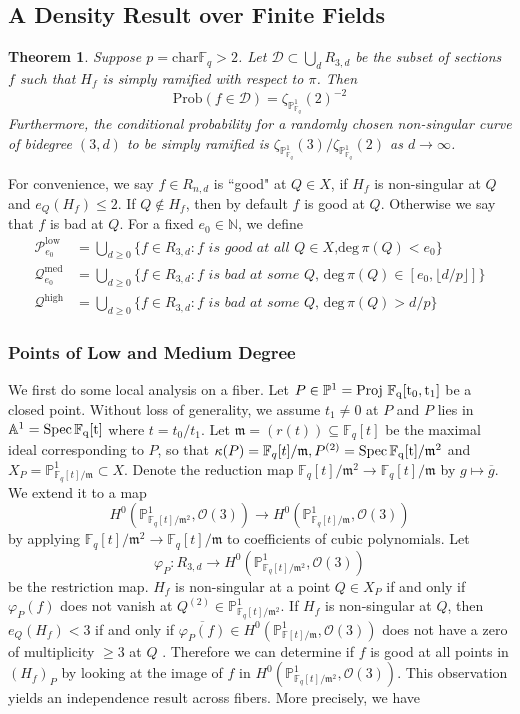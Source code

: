\documentclass[12pt]{article}
\theoremstyle{plain}
\newtheorem{theorem}[equation]{Theorem}
\theoremstyle{definition}
\newcommand{\fm}{\mathfrak{m}}
\newcommand{\IA}{\mathbb{A}}
\newcommand{\IN}{\mathbb{N}}
\newcommand{\IF}{\mathbb{F}}
\newcommand{\IP}{\mathbb{P}}
\newcommand{\sD}{\mathcal{D}}
\newcommand{\sO}{\mathcal{O}}
\newcommand{\sP}{\mathcal{P}}
\newcommand{\sQ}{\mathcal{Q}}
\renewcommand{\deg}{\mathrm{deg}\,}
\newcommand{\Spec}{\rm Spec\,}
\newcommand{\Proj}{\rm Proj\,}
\newcommand\union{\bigcup}
\newcommand\wb{\overline}
\newcommand{\<}{\langle}
\renewcommand{\>}{\rangle}
\newcommand{\Prob}{\mathrm{Prob}}
\begin{document}
\subsection{A Density Result over Finite Fields}
\begin{theorem}
\label{main}
Suppose $p = \mathrm{char } \IF_q > 2$. Let $\sD \subset \union_d R_{3,d}$ be the subset of sections $f$ such that $H_f$ is simply ramified with respect to $\pi$. Then
$$ \Prob(f \in \sD) = \zeta_{\IP^1_{\IF_q}}(2)^{-2} $$ Furthermore, the conditional probability for a randomly chosen non-singular curve of bidegree $(3, d)$ to be simply ramified is $\zeta_{\IP^1_{\IF_q}}(3)/\zeta_{\IP^1_{\IF_q}}(2)$ as $d \to \infty$. 
\end{theorem}
For convenience, we say $f \in R_{n, d}$ is ``good" at $Q \in X$, if $H_f$ is non-singular at $Q$ and $e_Q(H_f) \le 2$. If $Q \not\in H_f$, then by default $f$ is good at $Q$. Otherwise we say that $f$ is bad at $Q$. For a fixed $e_0 \in \IN$, we define 
\begin{align*}
\sP_{e_0}^{\mathrm{low}} &= \union_{d \ge 0} \{ f \in R_{3, d} : f \textit{ is good at all $Q \in X$,}\deg \pi(Q) < e_0\}\\
\sQ_{e_0}^{\mathrm{med}} &= \union_{d \ge 0} \{f \in R_{3, d} : f \textit{ is bad at some $Q$, }\deg \pi(Q) \in [e_0, \lfloor d/p \rfloor]\}\\
\sQ^{\mathrm{high}} &= \union_{d \ge 0} \{f \in R_{3, d} : f \textit{ is bad at some $Q$, }\deg \pi(Q) > d/p\}
\end{align*}
\subsubsection{Points of Low and Medium Degree}
We first do some local analysis on a fiber. Let $P \in \IP^1 = \Proj \, \IF_q[t_0, t_1]$ be a closed point. Without loss of generality, we assume $t_1 \neq 0$ at $P$ and $P$ lies in $\IA^1 = \Spec \IF_q[t]$ where $t = t_0/t_1$.   Let $\fm = (r(t))\subseteq \IF_q[t]$ be the maximal ideal corresponding to $P$, so that $\kappa(P) = \IF_q[t]/\fm, P^{(2)} = \Spec \IF_q[t]/\fm^2$ and $X_P = \IP^1_{\IF_q[t]/\fm} \subset X$. Denote the reduction map $\IF_q[t]/\fm^2 \to \IF_q[t]/\fm$ by $g \mapsto \overline{g}$. We extend it to a map $$ H^0(\IP^1_{\IF_q[t]/\fm^2}, \sO(3)) \to H^0(\IP^1_{\IF_q[t]/\fm}, \sO(3))$$ by applying $\IF_q[t]/\fm^2 \to \IF_q[t]/\fm$ to coefficients of cubic polynomials. Let $$\varphi_P : R_{3, d} \to H^0(\IP^1_{\IF_q[t]/\fm^2}, \sO(3))$$ be the restriction map. $H_f$ is non-singular at a point $Q \in X_P$ if and only if $\varphi_P(f)$ does not vanish at $Q^{(2)} \in \IP^1_{\IF_q[t]/\fm^2}$. If $H_f$ is non-singular at $Q$, then $e_Q(H_f) < 3$ if and only if $\wb{\varphi_P(f)} \in H^0(\IP^1_{\IF[t]/\fm}, \sO(3))$ does not have a zero of multiplicity $\ge 3$ at $Q$ . Therefore we can determine if $f$ is good at all points in $(H_f)_P$ by looking at the image of $f$ in $H^0(\IP^1_{\IF_q[t]/\fm^2}, \sO(3))$. This observation yields an independence result across fibers. More precisely, we have 
\end{document}

